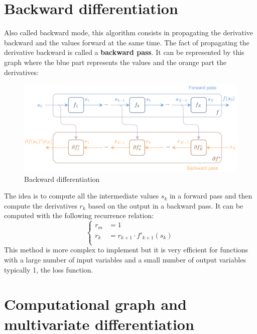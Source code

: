 \documentclass[12pt, openany]{report}
\theoremstyle{definition}
\begin{document}
\section{Backward differentiation}
Also called backward mode, this algorithm consists in propagating the derivative backward and the values forward at the same time. The fact of propagating the derivative backward is called a \textbf{backward pass}. It can be represented by this graph where the blue part represents the values and the orange part the derivatives:
\begin{figure}[H]
    \centering
    \includegraphics[width=\textwidth]{img/backward_diff.png}
    \caption{Backward differentiation}
    \label{fig:backward_diff}
\end{figure}
The idea is to compute all the intermediate values $s_k$ in a forward pass and then compute the derivatives $r_k$ based on the output in a backward pass. It can be computed with the following recurrence relation:
\begin{equation}
  \begin{cases}
    r_m &= 1 \\
    r_k &= r_{k+1} \cdot f'_{k+1}(s_{k})\\
  \end{cases}
\end{equation}
This method is more complex to implement but it is very efficient for functions with a large number of input variables and a small number of output variables typically 1, the loss function.
\section{Computational graph and multivariate differentiation}
\end{document}
